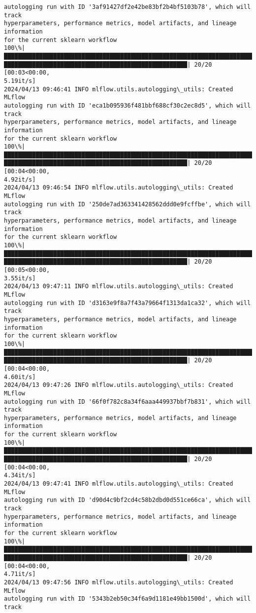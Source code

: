 \documentclass[11pt]{article}
\begin{document}
\begin{Verbatim}[commandchars=\\\{\}]
autologging run with ID '3af91427df2e42be83bf2b4bf5103b78', which will track
hyperparameters, performance metrics, model artifacts, and lineage information
for the current sklearn workflow
100\%|███████████████████████████████████████████████████████████████████████████
████████████████████████████████████████████████████| 20/20 [00:03<00:00,
5.19it/s]
2024/04/13 09:46:41 INFO mlflow.utils.autologging\_utils: Created MLflow
autologging run with ID 'eca1b095936f481bbf688cf30c2ec8d5', which will track
hyperparameters, performance metrics, model artifacts, and lineage information
for the current sklearn workflow
100\%|███████████████████████████████████████████████████████████████████████████
████████████████████████████████████████████████████| 20/20 [00:04<00:00,
4.92it/s]
2024/04/13 09:46:54 INFO mlflow.utils.autologging\_utils: Created MLflow
autologging run with ID '250de7ad363341428562ddd0e9fcffbe', which will track
hyperparameters, performance metrics, model artifacts, and lineage information
for the current sklearn workflow
100\%|███████████████████████████████████████████████████████████████████████████
████████████████████████████████████████████████████| 20/20 [00:05<00:00,
3.55it/s]
2024/04/13 09:47:11 INFO mlflow.utils.autologging\_utils: Created MLflow
autologging run with ID 'd3163e9f8a7f43a79664f1313da1ca32', which will track
hyperparameters, performance metrics, model artifacts, and lineage information
for the current sklearn workflow
100\%|███████████████████████████████████████████████████████████████████████████
████████████████████████████████████████████████████| 20/20 [00:04<00:00,
4.60it/s]
2024/04/13 09:47:26 INFO mlflow.utils.autologging\_utils: Created MLflow
autologging run with ID '66f0f782c8a34f6aaa449937bbf7b831', which will track
hyperparameters, performance metrics, model artifacts, and lineage information
for the current sklearn workflow
100\%|███████████████████████████████████████████████████████████████████████████
████████████████████████████████████████████████████| 20/20 [00:04<00:00,
4.34it/s]
2024/04/13 09:47:41 INFO mlflow.utils.autologging\_utils: Created MLflow
autologging run with ID 'd90d4c9bf2cd4c58b2dbd0d551ce66ca', which will track
hyperparameters, performance metrics, model artifacts, and lineage information
for the current sklearn workflow
100\%|███████████████████████████████████████████████████████████████████████████
████████████████████████████████████████████████████| 20/20 [00:04<00:00,
4.71it/s]
2024/04/13 09:47:56 INFO mlflow.utils.autologging\_utils: Created MLflow
autologging run with ID '5343b2eb50c34f6a9d1181e49bb1500d', which will track

\end{Verbatim}
\end{document}
